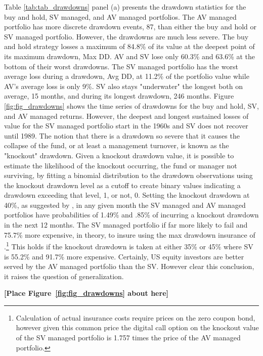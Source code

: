 Table \ref{tab:tab_drawdowns} panel (a) presents the drawdown statistics for the buy and hold, SV managed, and AV managed portfolios. The AV managed portfolio has more discrete drawdown events, 87, than either the buy and hold or SV managed portfolio. However, the drawdowns are much less severe. The buy and hold strategy losses a maximum of 84.8\% of its value at the deepest point of its maximum drawdown, Max DD. AV and SV lose only 60.3\% and 63.6\% at the bottom of their worst drawdowns. The SV managed portfolio has the worst average loss during a drawdown, Avg DD, at 11.2\% of the portfolio value while AV's average loss is only 9\%. SV also stays "underwater" the longest both on average, 15 months, and during its longest drawdown, 246 months. Figure \ref{fig:fig_drawdowns} shows the time series of drawdowns for the buy and hold, SV, and AV managed returns. However, the deepest and longest sustained losses of value for the SV managed portfolio start in the 1960s and SV does not recover until 1989. The notion that there is a drawdown so severe that it causes the collapse of the fund, or at least a management turnover, is known as the "knockout" drawdown. \citep{pav_notes_nodate} Given a knockout drawdown value, it is possible to estimate the likelihood of the knockout occurring, the fund or manager not surviving, by fitting a binomial distribution to the drawdown observations using the knockout drawdown level as a cutoff to create binary values indicating a drawdown exceeding that level, 1, or not, 0. \citep{pav_notes_nodate} Setting the knockout drawdown at 40\%, as suggested by \citet{pav_notes_nodate}, in any given month the SV managed and AV managed portfolios have probabilities of 1.49\% and .85\% of incurring a knockout drawdown in the next 12 months. The SV managed portfolio if far more likely to fail and 75.7\% more expensive, in theory, to insure using the max drawdown insurance of \citet{carr_maximum_2011}.\footnote{Calculation of actual insurance costs require prices on the zero coupon bond, however given this common price the digital call option on the knockout value of the SV managed portfolio is 1.757 times the price of the AV managed portfolio.} This holds if the knockout drawdown is taken at either 35\% or 45\% where SV is 55.2\% and 91.7\% more expensive. Certainly, US equity investors are better served by the AV managed portfolio than the SV. However clear this conclusion, it raises the question of generalization.

\bigskip
\centerline{\bf [Place Figure~\ref{fig:fig_drawdowns} about here]}
\bigskip

